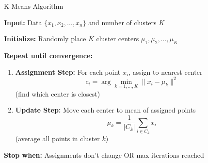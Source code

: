 \begin{frame}{K-Means Algorithm}

\begin{tcolorbox}[colback=blue!5, colframe=blue!50, title=\textbf{K-Means Algorithm}]

\textbf{Input:} Data $\{x_1, x_2, \ldots, x_n\}$ and number of clusters $K$

\vspace{0.5em}
\textbf{Initialize:} Randomly place $K$ cluster centers $\mu_1, \mu_2, \ldots, \mu_K$

\vspace{0.5em}
\textbf{Repeat until convergence:}

\vspace{0.3em}
\begin{enumerate}
\item \textbf{Assignment Step:} For each point $x_i$, assign to nearest center
\[
c_i = \arg\min_{k=1,\ldots,K} \|x_i - \mu_k\|^2
\]
\small (find which center is closest)

\vspace{0.5em}
\item \textbf{Update Step:} Move each center to mean of assigned points
\[
\mu_k = \frac{1}{|C_k|} \sum_{i \in C_k} x_i
\]
\small (average all points in cluster $k$)
\end{enumerate}

\vspace{0.5em}
\textbf{Stop when:} Assignments don't change OR max iterations reached
\end{tcolorbox}

\end{frame}

